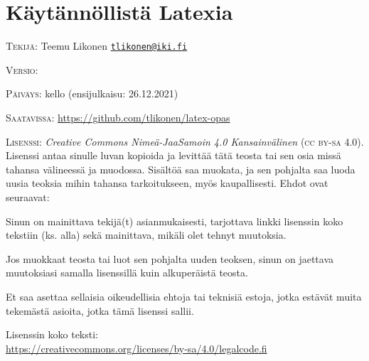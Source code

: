 \documentclass[fleqn]{book}
\makeatletter
\newcommand{\kulmasp}[1]
{\href{mailto:#1}{\guilsinglleft\nolinkurl{#1}\guilsinglright}}
\newcommand{\otsikko}{Käytännöllistä Latexia}
\newcommand{\tekijat}{Teemu Likonen \kulmasp{tlikonen@iki.fi}}
\makeatother
\begin{document}
{
  \setlength{\parindent}{0em}
  \setlength{\parskip}{1.2ex plus .1ex}

  \section*{\otsikko}

  \textsc{Tekijä:} \tekijat

  \textsc{Versio:} \versio

  \textsc{Päiväys:} \DTMtoday{} kello \DTMcurrenttime{} (ensijulkaisu:
  26.12.2021)

  \textsc{Saatavissa:} \url{https://github.com/tlikonen/latex-opas}

  \textsc{Lisenssi:} \emph{Creative Commons Nimeä-Jaa\-Samoin 4.0
    Kansainvälinen} (\textsc{cc by-sa} 4.0). Lisenssi antaa sinulle
  luvan kopioida ja levittää tätä teosta tai sen osia missä tahansa
  välineessä ja muodossa. Sisältöä saa muokata, ja sen pohjalta saa
  luoda uusia teoksia mihin tahansa tarkoitukseen, myös kaupallisesti.
  Ehdot ovat seuraavat:

  \begin{list}{\textbullet}{
      \setlength{\leftmargin}{1em}
      \setlength{\topsep}{0ex}
      \setlength{\partopsep}{0ex}
      \setlength{\itemsep}{0ex}
    }
  \item Sinun on mainittava tekijä(t) asianmukaisesti, tarjottava linkki
    lisenssin koko tekstiin (ks. alla) sekä mainittava, mikäli olet
    tehnyt muutoksia.
  \item Jos muokkaat teosta tai luot sen pohjalta uuden teoksen, sinun on
    jaettava muutoksiasi samalla lisenssillä kuin alkuperäistä teosta.
  \item Et saa asettaa sellaisia oikeudellisia ehtoja tai teknisiä
    estoja, jotka estävät muita tekemästä asioita, jotka tämä lisenssi
    sallii.
  \end{list}

  Lisenssin koko teksti: \\
  \url{https://creativecommons.org/licenses/by-sa/4.0/legalcode.fi}

}

\cleardoublepage

\pagestyle{plain}
\setcounter{tocdepth}{3}
\tableofcontents

\setcounter{secnumdepth}{-1}

\setcounter{secnumdepth}{2}





\setcounter{secnumdepth}{-1}
\end{document}
